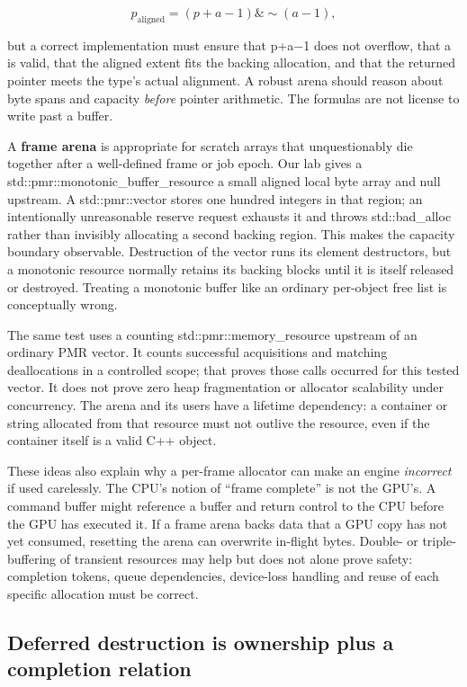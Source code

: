 \[
p_{\mathrm{aligned}}=(p+a-1)\mathbin{\&}\sim(a-1),
\]

but a correct implementation must ensure that p+a−1 does not overflow, that a is valid, that the aligned extent fits the backing allocation, and that the returned pointer meets the type's actual alignment. A robust arena should reason about byte spans and capacity \emph{before} pointer arithmetic. The formulas are not license to write past a buffer.

A \textbf{frame arena} is appropriate for scratch arrays that unquestionably die together after a well-defined frame or job epoch. Our lab gives a std::pmr::monotonic\_buffer\_resource a small aligned local byte array and null upstream. A std::pmr::vector stores one hundred integers in that region; an intentionally unreasonable reserve request exhausts it and throws std::bad\_alloc rather than invisibly allocating a second backing region. This makes the capacity boundary observable. Destruction of the vector runs its element destructors, but a monotonic resource normally retains its backing blocks until it is itself released or destroyed. Treating a monotonic buffer like an ordinary per-object free list is conceptually wrong.

The same test uses a counting std::pmr::memory\_resource upstream of an ordinary PMR vector. It counts successful acquisitions and matching deallocations in a controlled scope; that proves those calls occurred for this tested vector. It does not prove zero heap fragmentation or allocator scalability under concurrency. The arena and its users have a lifetime dependency: a container or string allocated from that resource must not outlive the resource, even if the container itself is a valid C++ object.

These ideas also explain why a per-frame allocator can make an engine \emph{incorrect} if used carelessly. The CPU's notion of ``frame complete'' is not the GPU's. A command buffer might reference a buffer and return control to the CPU before the GPU has executed it. If a frame arena backs data that a GPU copy has not yet consumed, resetting the arena can overwrite in-flight bytes. Double- or triple-buffering of transient resources may help but does not alone prove safety: completion tokens, queue dependencies, device-loss handling and reuse of each specific allocation must be correct.

\subsection{Deferred destruction is ownership plus a completion relation}\label{05-engine-i-ch007-deferred-destruction-is-ownership-plus-a-completion-relation}

